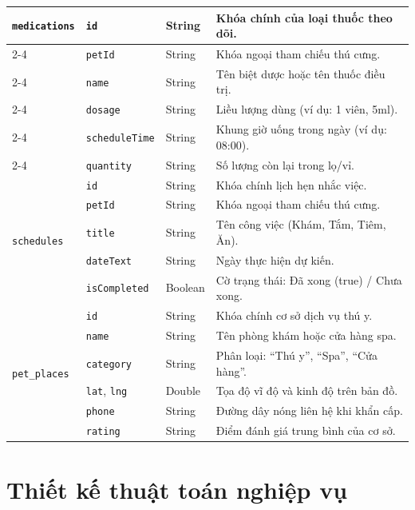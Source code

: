 \begin{table}[H]
\begin{tabularx}{\textwidth}{|l|l|l|X|}
        \multirow{6}{*}{\texttt{medications}}
        & \texttt{id} & String & Khóa chính của loại thuốc theo dõi. \\ \cline{2-4}
        & \texttt{petId} & String & Khóa ngoại tham chiếu thú cưng. \\ \cline{2-4}
        & \texttt{name} & String & Tên biệt dược hoặc tên thuốc điều trị. \\ \cline{2-4}
        & \texttt{dosage} & String & Liều lượng dùng (ví dụ: 1 viên, 5ml). \\ \cline{2-4}
        & \texttt{scheduleTime} & String & Khung giờ uống trong ngày (ví dụ: 08:00). \\ \cline{2-4}
        & \texttt{quantity} & String & Số lượng còn lại trong lọ/vỉ. \\ \hline

        \multirow{5}{*}{\texttt{schedules}}
        & \texttt{id} & String & Khóa chính lịch hẹn nhắc việc. \\ \cline{2-4}
        & \texttt{petId} & String & Khóa ngoại tham chiếu thú cưng. \\ \cline{2-4}
        & \texttt{title} & String & Tên công việc (Khám, Tắm, Tiêm, Ăn). \\ \cline{2-4}
        & \texttt{dateText} & String & Ngày thực hiện dự kiến. \\ \cline{2-4}
        & \texttt{isCompleted} & Boolean & Cờ trạng thái: Đã xong (true) / Chưa xong. \\ \hline

        \multirow{6}{*}{\texttt{pet\_places}}
        & \texttt{id} & String & Khóa chính cơ sở dịch vụ thú y. \\ \cline{2-4}
        & \texttt{name} & String & Tên phòng khám hoặc cửa hàng spa. \\ \cline{2-4}
        & \texttt{category} & String & Phân loại: ``Thú y'', ``Spa'', ``Cửa hàng''. \\ \cline{2-4}
        & \texttt{lat}, \texttt{lng} & Double & Tọa độ vĩ độ và kinh độ trên bản đồ. \\ \cline{2-4}
        & \texttt{phone} & String & Đường dây nóng liên hệ khi khẩn cấp. \\ \cline{2-4}
        & \texttt{rating} & String & Điểm đánh giá trung bình của cơ sở. \\ \hline
    \end{tabularx}
\end{table}

\section{Thiết kế thuật toán nghiệp vụ}
\label{sec:thiet_ke_thuat_toan}

